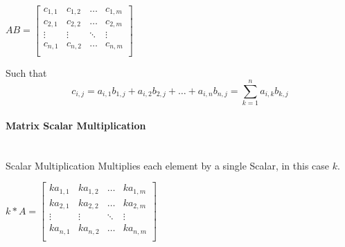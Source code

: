 \begin{flushleft}
                    \begin{center}
                        $
                        AB = 
                        \begin{bmatrix}
                            c_{1,1} & c_{1,2} & \hdots  & c_{1,m} \\
                            c_{2,1} & c_{2,2} & \hdots  & c_{2,m} \\
                            \vdots  & \vdots  & \ddots  & \vdots  \\
                            c_{n,1} & c_{n,2} & \hdots  & c_{n,m} \\
                        \end{bmatrix}
                        $
                    \end{center}
                    \vspace{0.2cm}
                    \begin{center}
                        Such that \[ c_{i,j} = a_{i,1}b_{1,j} + a_{i,2}b_{2,j} + \hdots + a_{i,n}b_{n,j} = \sum^{n}_{k=1}a_{i,k}b_{k,j} \]
                    \end{center}

                \paragraph{Matrix Scalar Multiplication} \mbox{} \\
                    \vspace{0.2cm}
                    Scalar Multiplication Multiplies each element by a single Scalar, in this case $k$. \\

                    \begin{center}
                        $
                        k * A = 
                        \begin{bmatrix}
                            ka_{1,1} & ka_{1,2} & \hdots  & ka_{1,m} \\
                            ka_{2,1} & ka_{2,2} & \hdots  & ka_{2,m} \\
                            \vdots  & \vdots  & \ddots  & \vdots  \\
                            ka_{n,1} & ka_{n,2} & \hdots  & ka_{n,m} \\
                        \end{bmatrix}
                        $
                    \end{center}


\end{flushleft}
